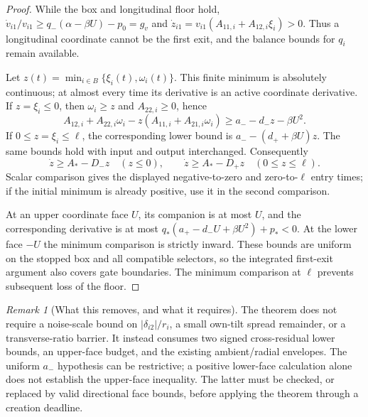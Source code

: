 \documentclass{article} %
\theoremstyle{plain}
\theoremstyle{definition}
\theoremstyle{remark}
\newtheorem{remark}[theorem]{Remark}
\begin{document}
\begin{proof}
While the box and longitudinal floor hold,
$\dot v_{i1}/v_{i1}\ge q_-(\alpha-\beta U)-p_0=g_v$ and
$\dot z_{i1}=v_{i1}(A_{11,i}+A_{12,i}\xi_i)>0$.
Thus a longitudinal coordinate cannot be the first exit, and the balance
bounds for $q_i$ remain available.

Let $z(t)=\min_{i\in B}\{\xi_i(t),\omega_i(t)\}$.
This finite minimum is absolutely continuous; at almost every time its
derivative is an active coordinate derivative. If $z=\xi_i\le0$, then
$\omega_i\ge z$ and $A_{22,i}\ge0$, hence
\[
 A_{12,i}+A_{22,i}\omega_i
    -z(A_{11,i}+A_{21,i}\omega_i)
 \ge a_--d_-z-\beta U^2.
\]
If $0\le z=\xi_i\le\ell$, the corresponding lower bound is
$a_--(d_++\beta U)z$. The same bounds hold with input and output
interchanged. Consequently
\[
 \dot z\ge A_*-D_-z\quad(z\le0),\qquad
 \dot z\ge A_*-D_+z\quad(0\le z\le\ell).
\]
Scalar comparison gives the displayed negative-to-zero and
zero-to-$\ell$ entry times; if the initial minimum is already positive,
use it in the second comparison.

At an upper coordinate face $U$, its companion is at most $U$, and
the corresponding derivative is at most
$q_*(a_+-d_-U+\beta U^2)+p_*<0$.
At the lower face $-U$ the minimum comparison is strictly inward.
These bounds are uniform on the stopped box and all compatible selectors,
so the integrated first-exit argument also covers gate boundaries.
The minimum comparison at $\ell$ prevents subsequent loss of the floor.
\end{proof}

\begin{remark}[What this removes, and what it requires]
The theorem does not require a noise-scale bound on
$|\delta_{i2}|/r_i$, a small own-tilt spread remainder, or a transverse-ratio
barrier. It instead consumes two signed cross-residual lower bounds, an
upper-face budget, and the existing ambient/radial envelopes.
The uniform $a_-$ hypothesis can be restrictive; a positive lower-face
calculation alone does not establish the upper-face inequality.
The latter must be checked, or replaced by valid directional face bounds,
before applying the theorem through a creation deadline.
\end{remark}
\end{document}
